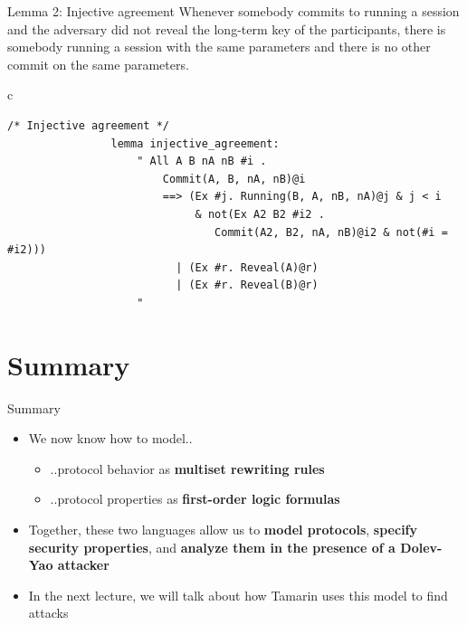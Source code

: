 \documentclass[11pt,aspectratio=169]{beamer}
\begin{document}
\begin{frame}[fragile]{Lemma 2: Injective agreement}
    Whenever somebody commits to running a session and the adversary did not 
    reveal the long-term key of the participants, there is somebody running a 
    session with the same parameters and there is no other commit on the same 
    parameters.\vfill
    \begin{center}
        \begin{tabular}{c}
            \begin{lstlisting}[style=tamarin, gobble=16]
                /* Injective agreement */
                lemma injective_agreement:
                    " All A B nA nB #i .
                        Commit(A, B, nA, nB)@i
                        ==> (Ex #j. Running(B, A, nB, nA)@j & j < i
                             & not(Ex A2 B2 #i2 .
                                Commit(A2, B2, nA, nB)@i2 & not(#i = #i2)))
                          | (Ex #r. Reveal(A)@r)
                          | (Ex #r. Reveal(B)@r)
                    "
            \end{lstlisting}
        \end{tabular}
    \end{center}
\end{frame}


\section*{Summary}


\begin{frame}[fragile]{Summary}
    \begin{itemize}
        \item We now know how to model..
        \begin{itemize}
            \item ..protocol behavior as \textbf{multiset rewriting rules}
            \item ..protocol properties as \textbf{first-order logic formulas}
        \end{itemize}
        \item Together, these two languages allow us to
              \textbf{model protocols}, \textbf{specify security properties}, 
              and \textbf{analyze them in the presence of a Dolev-Yao attacker}
        \item In the next lecture, we will talk about how Tamarin uses this 
              model to find attacks
    \end{itemize}
\end{frame}
\end{document}

